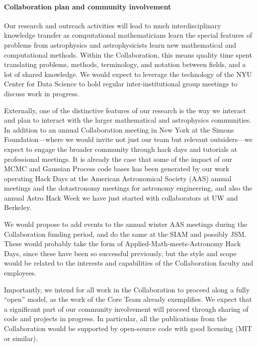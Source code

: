 \documentclass[12pt]{article}
\begin{document}
\paragraph{Collaboration plan and community involvement}

Our research and outreach activities will lead to much
interdisciplinary knowledge transfer as computational mathematicians
learn the special features of problems from astrophysics and
astrophysicists learn new mathematical and computational methods.
Within the Collaboration, this means quality time spent translating
problems, methods, terminology, and notation between fields, and a lot
of shared knowledge.
We would expect to leverage the technology of the NYU Center for Data
Science to hold regular inter-institutional group meetings to discuss
work in progress.

Externally, one of the distinctive features of our research is the way
we interact and plan to interact with the larger mathematical and
astrophysics communities.
In addition to an annual Collaboration meeting in New York at the
Simons Foundation---where we would invite not just our team but
relevant outsiders---we expect to engage the broader community through
hack days and tutorials at professional meetings.
It is already the case that some of the impact of our MCMC and
Gaussian Process code bases has been generated by our work operating Hack
Days at the American Astronomical Society (AAS) annual meetings and the
dotastronomy meetings for astronomy engineering, and also the annual
Astro Hack Week we have just started with collaborators at UW and
Berkeley.

We would propose to add events to the annual winter AAS meetings
during the Collaboration funding period, and do the same at the SIAM
and possibly JSM.
These would probably take the form of Applied-Math-meets-Astronomy
Hack Days, since these have been so successful previously, but the
style and scope would be related to the interests and capabilities of
the Collaboration faculty and employees.

Importantly, we intend for all work in the Collaboration to proceed
along a fully ``open'' model, as the work of the Core Team already
exemplifies.
We expect that a significant part of our community involvement will
proceed through sharing of code and projects in progress.
In particular, all the publications from the Collaboration would be
supported by open-source code with good licensing (MIT or similar).
\end{document}
